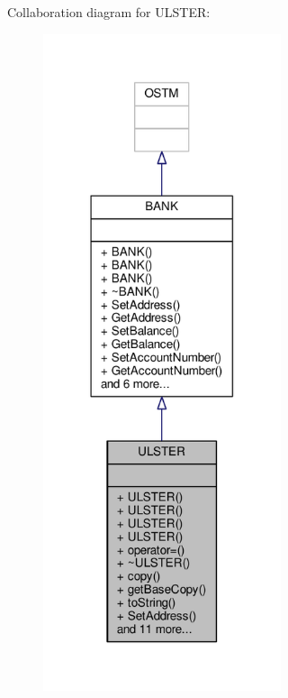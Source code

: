 Collaboration diagram for U\+L\+S\+T\+ER\+:
\nopagebreak
\begin{figure}[H]
\begin{center}
\leavevmode
\includegraphics[width=198pt]{class_u_l_s_t_e_r__coll__graph}
\end{center}
\end{figure}
